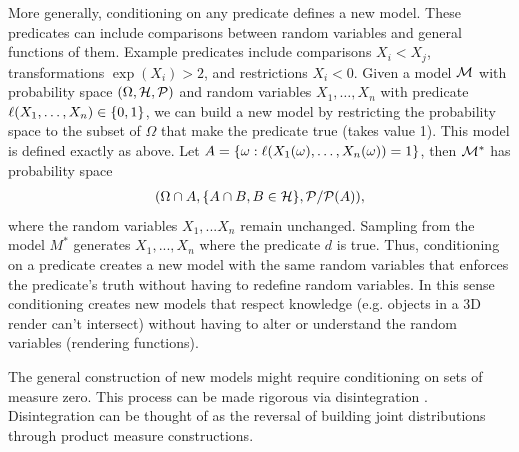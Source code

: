 More generally, conditioning on any predicate defines a new model. These
predicates can include comparisons between random variables and general
functions of them. Example predicates include
comparisons $X_i < X_j$, transformations $\exp(X_i) > 2$, and restrictions $X_i < 0$.
Given
a model ${\cal M}$  with probability space $(\Omega, {\cal H}, {\cal P})$ and
random variables $X_1,\dots, X_n$ with predicate $\operatorname{\ell}(X_1, \dots, X_n) \in \{0, 1\}$,
we can build a new model by restricting the probability space to the subset of
$\Omega$ that make the predicate true (takes value 1). This model
is defined exactly as above.  Let $A = \{\omega : \operatorname{\ell}(X_1(\omega), \dots, X_n(\omega)) = 1\}$,
then ${\cal M}^*$ has probability space
\begin{align*}
	(\Omega \cap A, \{A \cap B, B \in {\cal H} \}, {\cal P} / {\cal P}(A)),
\end{align*}
where the random variables $X_1,...X_n$ remain unchanged. Sampling from
the model $M^*$ generates $X_1, ..., X_n$ where the predicate $d$ is true.
Thus, conditioning on a predicate creates a new model with the same
random variables that enforces the predicate's truth
without having to redefine random variables. In this sense conditioning
creates new models that respect knowledge (e.g. objects in a 3D render
can't intersect) without having to alter or understand the random variables (rendering functions).

The general construction of new models might require conditioning
on sets of measure zero. This process can be made rigorous
via disintegration \citep{chang1997conditioning}. Disintegration can
be thought of as the reversal of building joint distributions through
product measure constructions.



